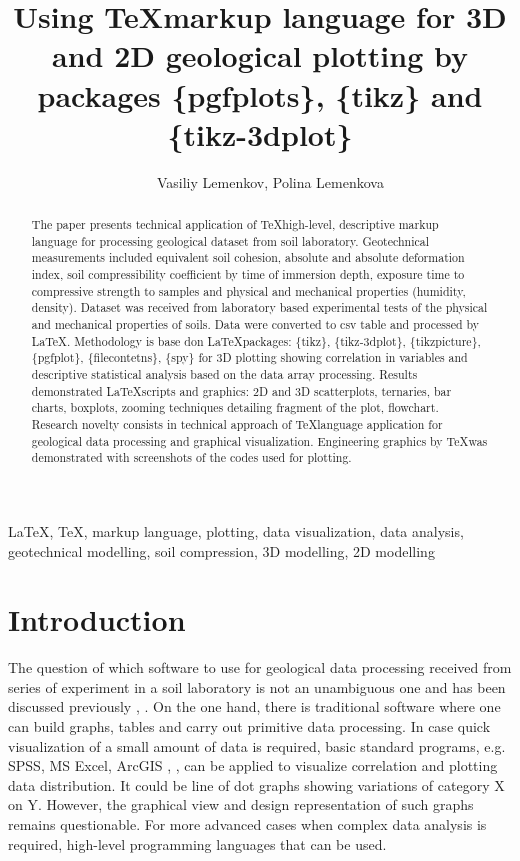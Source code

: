 \documentclass[a4paper,10pt]{article}
\date{}
\title{\textbf{Using \TeX \space markup language for 3D and 2D geological plotting by packages \{pgfplots\}, \{tikz\} and \{tikz-3dplot\} }}
\author{ $\,\,\,\,\,\,\,$ Vasiliy Lemenkov, Polina Lemenkova \address{Geoprojectsurvey LLC, Moscow, Russia and Analytical Center, Moscow, Russia, \{wasiliy.lemenkov, pauline.lemenkova\}@gmail.com}}
\begin{document}
\maketitle

\begin{abstract}
The paper presents technical application of \TeX \space high-level, descriptive markup language for processing geological dataset from soil laboratory. Geotechnical measurements included equivalent soil cohesion, absolute and absolute deformation index, soil compressibility coefficient by time of immersion depth, exposure time to compressive strength to samples and physical and mechanical properties (humidity, density). Dataset was received from laboratory based experimental tests of the physical and mechanical properties of soils. Data were converted to csv table and processed by \LaTeX. Methodology is base don \LaTeX \space packages: \{tikz\}, \{tikz-3dplot\}, \{tikzpicture\}, \{pgfplot\}, \{filecontetns\}, \{spy\} for 3D plotting showing correlation in variables and descriptive statistical analysis based on the data array processing. Results demonstrated \LaTeX \space scripts and graphics: 2D and 3D scatterplots, ternaries, bar charts, boxplots, zooming techniques  detailing fragment of the plot, flowchart. Research novelty consists in technical approach of \TeX \space  language application for geological data processing and graphical visualization. Engineering graphics by \TeX \space was demonstrated with screenshots of the codes used for plotting. 
\end{abstract}

\begin{keywords}
\LaTeX, \TeX, markup language, plotting, data visualization, data analysis, geotechnical modelling, soil compression, 3D modelling, 2D modelling
\end{keywords}


\section{Introduction}

The question of which software to use for geological data processing received from series of experiment in a soil laboratory is not an unambiguous one and has been discussed previously \cite{DrielDavis1989}, \cite{DavisHerzfeld1993}. On the one hand, there is traditional software where one can build graphs, tables and carry out primitive data processing. In case quick visualization of a small amount of data is required, basic standard programs, e.g. SPSS, MS Excel, ArcGIS  \cite{Lemenkova201990}, \cite{Klaucoetal2013}, can be applied to visualize correlation and plotting data distribution. It could be line of dot graphs showing variations of category X on Y. However, the graphical view and design representation of such graphs remains questionable. For more advanced cases when complex data analysis is required, high-level programming languages that can be used. 
\end{document}
